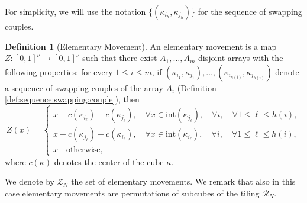 \documentclass[12 pt]{article}
\theoremstyle{definition} \newtheorem{definition}{Definition}[section]
\theoremstyle{definition} \newtheorem{remark}[definition]{Remark}
\theoremstyle{plain} \newtheorem{lemma}[definition]{Lemma}
\theoremstyle{plain} \newtheorem{proposition}[definition]{Proposition}
\theoremstyle{plain} \newtheorem{theorem}[definition]{Theorem}
\theoremstyle{plain} \newtheorem{corollary}[definition]{Corollary}
\theoremstyle{definition} \newtheorem{example}[definition]{Example}
\theoremstyle{definition} \newtheorem{assumption}[definition]{Assumption}
\theoremstyle{definition} \newtheorem{conjecture}[definition]{Conjecture}
\newcommand{\1}{\mathbbm 1}
\numberwithin{equation}{section}
\begin{document}
For simplicity, we will use the notation $\lbrace (\kappa_{i_h},\kappa_{j_h})\rbrace$ for the sequence of swapping couples.
\begin{definition}[Elementary Movement]\label{def:new:elem:movement}
    An elementary movement is a map $Z:[0,1]^\nu\rightarrow[0,1]^\nu$ such that there exist $A_1,\dots,A_m$ disjoint arrays with the following properties:
    for every $1\leq i\leq m$, if $(\kappa_{i_1},\kappa_{j_1}),\dots,(\kappa_{i_{h(i)}},\kappa_{j_{h(i)}})$ denote a sequence of swapping couples of the array $A_i$ (Definition \ref{def:sequence:swapping:couple}), then 
    \begin{equation*}
        Z(x)=\begin{cases}
            x+ c(\kappa_{i_\ell})-c(\kappa_{j_\ell}),\quad \forall x\in \text{int}(\kappa_{j_\ell}),\quad\forall i,\quad \forall 1\leq\ell\leq h(i), \\
              x+ c(\kappa_{j_\ell})-c(\kappa_{i_\ell}),\quad \forall x\in \text{int}(\kappa_{i_\ell}),\quad\forall i,\quad \forall 1\leq\ell\leq h(i),\\
              x\quad\text{otherwise},
        \end{cases}
    \end{equation*}
    where $c(\kappa)$ denotes the center of the cube $\kappa$.
\end{definition}
We denote by $\mathcal{Z}_N$ the set of elementary movements.  We remark that also in this case elementary movements are permutations of subcubes of the tiling $\mathcal{R}_N$. 
\end{document}
